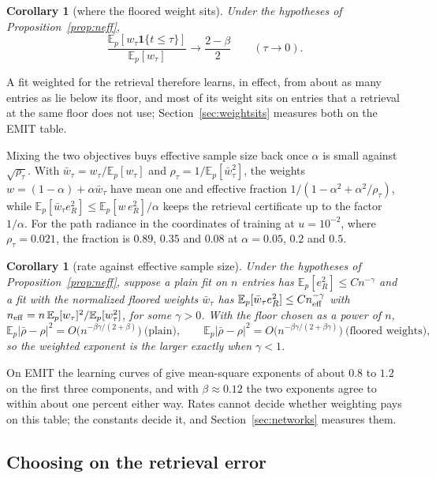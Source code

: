 \documentclass[11pt]{article}
\newtheorem{corollary}[lemma]{Corollary}
\theoremstyle{remark}
\newcommand{\E}{\mathbb{E}}
\newcommand{\1}{\mathbf{1}}
\begin{document}
\begin{corollary}[where the floored weight sits]\label{cor:below}
Under the hypotheses of Proposition~\ref{prop:neff},
\[
\frac{\E_p[w_\tau\1\{t\le\tau\}]}{\E_p[w_\tau]}\longrightarrow\frac{2-\beta}{2}\qquad(\tau\to0).
\]
\end{corollary}

A fit weighted for the retrieval therefore learns, in effect, from about as many entries as lie below its floor,
and most of its weight sits on entries that a retrieval at the same floor does not use; Section~\ref{sec:weightsits}
measures both on the EMIT table.

Mixing the two objectives buys effective sample size back once $\alpha$ is small against $\sqrt{\rho_\tau}$. With
$\bar w_\tau=w_\tau/\E_p[w_\tau]$ and $\rho_\tau=1/\E_p[\bar w_\tau^2]$, the weights $w=(1-\alpha)+\alpha\bar w_\tau$
have mean one and effective fraction $1/(1-\alpha^2+\alpha^2/\rho_\tau)$, while $\E_p[\bar w_\tau e_R^2]\le\E_p[w\,e_R^2]
/\alpha$ keeps the retrieval certificate up to the factor $1/\alpha$. For the path radiance in the coordinates of
training at $u=10^{-2}$, where $\rho_\tau=0.021$, the fraction is $0.89$, $0.35$ and $0.08$ at $\alpha=0.05$, $0.2$ and
$0.5$.

\begin{corollary}[rate against effective sample size]\label{cor:neff-rate}
Under the hypotheses of Proposition~\ref{prop:neff}, suppose a plain fit on $n$ entries has $\E_p[e_R^2]\le Cn^{-\gamma}$
and a fit with the normalized floored weights $\bar w_\tau$ has $\E_p[\bar w_\tau e_R^2]\le Cn_{\rm eff}^{-\gamma}$ with
$n_{\rm eff}=n\,\E_p[w_\tau]^2/\E_p[w_\tau^2]$, for some $\gamma>0$. With the floor chosen as a power of $n$,
\[
\E_p|\bar\rho-\rho|^2=O\bigl(n^{-\beta\gamma/(2+\beta)}\bigr)\ \text{(plain)},\qquad
\E_p|\bar\rho-\rho|^2=O\bigl(n^{-\beta\gamma/(2+\beta\gamma)}\bigr)\ \text{(floored weights)},
\]
so the weighted exponent is the larger exactly when $\gamma<1$.
\end{corollary}

On EMIT the learning curves of \cite{shmalo2} give mean-square exponents of about $0.8$ to $1.2$ on the first three
components, and with $\beta\approx0.12$ the two exponents agree to within about one percent either way. Rates cannot
decide whether weighting pays on this table; the constants decide it, and Section~\ref{sec:networks} measures them.

\subsection{Choosing on the retrieval error}\label{sec:choosing}
\end{document}
